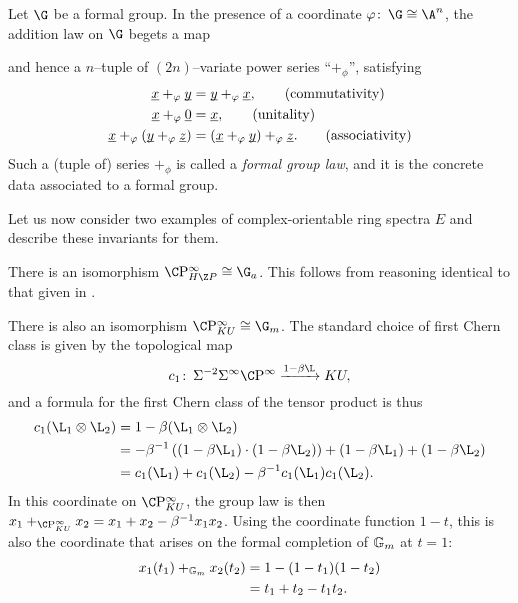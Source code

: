 \begin{definition}\label{FGLDefinition}
Let \(\G\) be a formal group.  In the presence of a coordinate \(\phi \co \G \cong \A^n\), the addition law on \(\G\) begets a map
\begin{center}
\end{center}
and hence a \(n\)--tuple of \((2n)\)--variate power series ``\(+_\phi\)'', satisfying
\begin{align*}
\underline{\smash x} +_\phi \underline{\smash y} & = \underline{\smash y} +_\phi \underline{\smash x}, \tag{commutativity} \\
\underline{\smash x} +_\phi \underline{\smash 0} & = \underline{\smash x}, \tag{unitality} \\
\underline{\smash x} +_\phi (\underline{\smash y} +_\phi \underline{\smash z}) & = (\underline{\smash x} +_\phi \underline{\smash y}) +_\phi \underline{\smash z}. \tag{associativity}
\end{align*}
Such a (tuple of) series \(+_\phi\) is called a \textit{formal group law}, and it is the concrete data associated to a formal group.
\end{definition}

Let us now consider two examples of complex-orientable ring spectra \(E\) and describe these invariants for them.

\begin{example}\label{HZGivesGa}
There is an isomorphism \(\CP^\infty_{H\Z P} \cong \G_a\).  This follows from reasoning identical to that given in .
\end{example}

\begin{example}\label{CPinftyKUExample}
There is also an isomorphism \(\CP^\infty_{KU} \cong \G_m\).  The standard choice of first Chern class is given by the topological map \[c_1\co \Susp^{-2} \Susp^\infty \CP^\infty \xrightarrow{1 - \beta \L} KU,\] and a formula for the first Chern class of the tensor product is thus
\begin{align*}
c_1(\L_1 \otimes \L_2) & = 1 - \beta(\L_1 \otimes \L_2) \\
& = -\beta^{-1} \left( (1 - \beta \L_1) \cdot (1 - \beta \L_2) \right) + (1 - \beta \L_1) + (1 - \beta \L_2) \\
& = c_1(\L_1) + c_1(\L_2) - \beta^{-1} c_1(\L_1) c_1(\L_2).
\end{align*}
In this coordinate on \(\CP^\infty_{KU}\), the group law is then \(x_1 +_{\CP^\infty_{KU}} x_2 = x_1 + x_2 - \beta^{-1} x_1 x_2\).  Using the coordinate function \(1 - t\), this is also the coordinate that arises on the formal completion of \(\Gm\) at \(t = 1\):
\begin{align*}
x_1(t_1) +_{\Gm} x_2(t_2) & = 1 - (1 - t_1)(1 - t_2) \\
& = t_1 + t_2 - t_1 t_2.
\end{align*}
\end{example}

